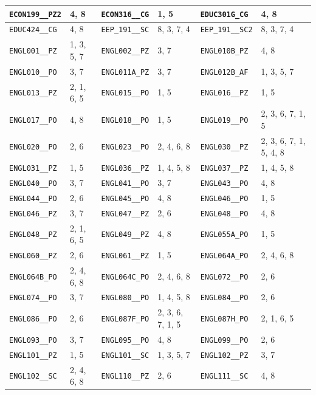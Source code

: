 \begin{longtable}{|l|l||l|l||l|l|}
    \verb|ECON199__PZ2| & 4, 8 & \verb|ECON316__CG| & 1, 5 & \verb|EDUC301G_CG| & 4, 8\\\hline
    \verb|EDUC424__CG| & 4, 8 & \verb|EEP_191__SC| & 8, 3, 7, 4 & \verb|EEP_191__SC2| & 8, 3, 7, 4\\\hline
    \verb|ENGL001__PZ| & 1, 3, 5, 7 & \verb|ENGL002__PZ| & 3, 7 & \verb|ENGL010B_PZ| & 4, 8\\\hline
    \verb|ENGL010__PO| & 3, 7 & \verb|ENGL011A_PZ| & 3, 7 & \verb|ENGL012B_AF| & 1, 3, 5, 7\\\hline
    \verb|ENGL013__PZ| & 2, 1, 6, 5 & \verb|ENGL015__PO| & 1, 5 & \verb|ENGL016__PZ| & 1, 5\\\hline
    \verb|ENGL017__PO| & 4, 8 & \verb|ENGL018__PO| & 1, 5 & \verb|ENGL019__PO| & 2, 3, 6, 7, 1, 5\\\hline
    \verb|ENGL020__PO| & 2, 6 & \verb|ENGL023__PO| & 2, 4, 6, 8 & \verb|ENGL030__PZ| & 2, 3, 6, 7, 1, 5, 4, 8\\\hline
    \verb|ENGL031__PZ| & 1, 5 & \verb|ENGL036__PZ| & 1, 4, 5, 8 & \verb|ENGL037__PZ| & 1, 4, 5, 8\\\hline
    \verb|ENGL040__PO| & 3, 7 & \verb|ENGL041__PO| & 3, 7 & \verb|ENGL043__PO| & 4, 8\\\hline
    \verb|ENGL044__PO| & 2, 6 & \verb|ENGL045__PO| & 4, 8 & \verb|ENGL046__PO| & 1, 5\\\hline
    \verb|ENGL046__PZ| & 3, 7 & \verb|ENGL047__PZ| & 2, 6 & \verb|ENGL048__PO| & 4, 8\\\hline
    \verb|ENGL048__PZ| & 2, 1, 6, 5 & \verb|ENGL049__PZ| & 4, 8 & \verb|ENGL055A_PO| & 1, 5\\\hline
    \verb|ENGL060__PZ| & 2, 6 & \verb|ENGL061__PZ| & 1, 5 & \verb|ENGL064A_PO| & 2, 4, 6, 8\\\hline
    \verb|ENGL064B_PO| & 2, 4, 6, 8 & \verb|ENGL064C_PO| & 2, 4, 6, 8 & \verb|ENGL072__PO| & 2, 6\\\hline
    \verb|ENGL074__PO| & 3, 7 & \verb|ENGL080__PO| & 1, 4, 5, 8 & \verb|ENGL084__PO| & 2, 6\\\hline
    \verb|ENGL086__PO| & 2, 6 & \verb|ENGL087F_PO| & 2, 3, 6, 7, 1, 5 & \verb|ENGL087H_PO| & 2, 1, 6, 5\\\hline
    \verb|ENGL093__PO| & 3, 7 & \verb|ENGL095__PO| & 4, 8 & \verb|ENGL099__PO| & 2, 6\\\hline
    \verb|ENGL101__PZ| & 1, 5 & \verb|ENGL101__SC| & 1, 3, 5, 7 & \verb|ENGL102__PZ| & 3, 7\\\hline
    \verb|ENGL102__SC| & 2, 4, 6, 8 & \verb|ENGL110__PZ| & 2, 6 & \verb|ENGL111__SC| & 4, 8\\\hline

\end{longtable}
